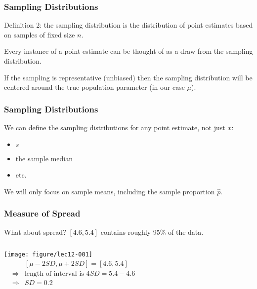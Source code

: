 \documentclass[handout]{beamer}
\newcommand{\blue}[1]{\textcolor{blue2}{#1}}
\newcommand{\xbar}{\overline{x}}
\begin{document}
\begin{frame}[fragile]
\frametitle{Sampling Distributions}

\blue{Definition 2}: the \blue{sampling distribution} is the distribution of point estimates based on samples of fixed size $n$.  

\pause \vspace{0.5cm}

Every instance of a point estimate can be thought of as a draw from the sampling distribution.

\pause \vspace{0.5cm}

If the sampling is \blue{representative} (unbiased) then the sampling distribution will be centered around the true population parameter (in our case $\mu$).  

\end{frame}


\begin{frame}[fragile]
\frametitle{Sampling Distributions}

We can define the sampling distributions for \blue{any} point estimate, not just $\xbar$:
\pause \begin{itemize}
\item $s$
\item the sample median
\item etc.
\end{itemize}

\pause We will only focus on sample means, including the sample proportion $\widehat{p}$.

\end{frame}


\begin{frame}[fragile]
\frametitle{Measure of Spread}
What about spread?  $[4.6, 5.4]$ contains roughly 95\% of the data.

\begin{columns}[c]
\texttt{[image: figure/lec12-001]}
\pause{}
\begin{eqnarray*}
&& [\mu - 2 SD, \mu + 2SD] = [4.6, 5.4]\\
&\Rightarrow& \mbox{length of interval is } 4SD = 5.4-4.6\\
&\Rightarrow& SD = 0.2
\end{eqnarray*}
\end{columns}




\end{frame}
\end{document}
